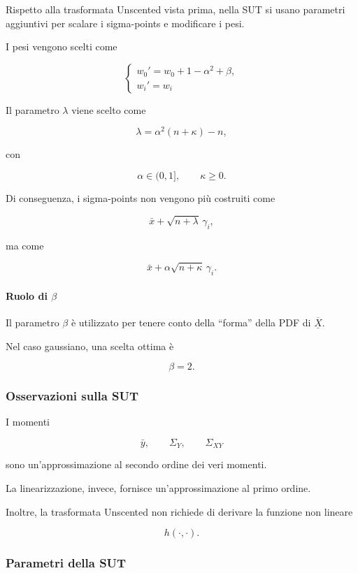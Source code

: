\documentclass[11pt,a4paper]{article}
\begin{document}
Rispetto alla trasformata Unscented vista prima, nella SUT si usano parametri aggiuntivi per scalare i sigma-points e modificare i pesi.

I pesi vengono scelti come

\[
\begin{cases}
w_0' = w_0 + 1-\alpha^2+\beta,\\[0.4em]
w_i' = w_i
\end{cases}
\]

Il parametro \(\lambda\) viene scelto come

\[
\lambda=\alpha^2(n+\kappa)-n,
\]

con

\[
\alpha\in(0,1],
\qquad
\kappa\geq 0.
\]

Di conseguenza, i sigma-points non vengono più costruiti come

\[
\bar x+\sqrt{n+\lambda}\,\gamma_i,
\]

ma come

\[
\bar x+\alpha\sqrt{n+\kappa}\,\gamma_i.
\]

\paragraph{Ruolo di \(\beta\)}

Il parametro \(\beta\) è utilizzato per tenere conto della ``forma'' della PDF di \(\overline{\underline{X}}\).

Nel caso gaussiano, una scelta ottima è

\[
\beta=2.
\]

\subsubsection*{Osservazioni sulla SUT}

I momenti

\[
\bar y,\qquad \Sigma_Y,\qquad \Sigma_{XY}
\]

sono un'approssimazione al secondo ordine dei veri momenti.

La linearizzazione, invece, fornisce un'approssimazione al primo ordine.

Inoltre, la trasformata Unscented non richiede di derivare la funzione non lineare

\[
h(\cdot,\cdot).
\]

\subsubsection*{Parametri della SUT}
\end{document}
